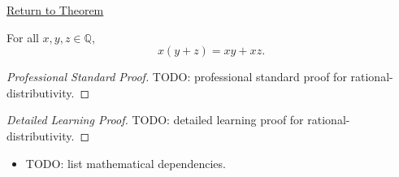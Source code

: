 \newpage
{}
\label{prf:rational-distributivity}

\begin{remark*}[Return]
\hyperref[thm:rational-distributivity]{Return to Theorem}
\end{remark*}

\begin{theorem*}
For all $x,y,z\in\mathbb{Q}$,
\[
x(y+z)=xy+xz.
\]
\end{theorem*}

\begin{proof}[Professional Standard Proof]
\LRAProofBodyStart
TODO: professional standard proof for rational-distributivity.
\end{proof}

\begin{proof}[Detailed Learning Proof]
\LRAProofBodyStart
TODO: detailed learning proof for rational-distributivity.
\end{proof}

\begin{remark*}
\end{remark*}

\begin{dependencies}
\begin{itemize}
  \item TODO: list mathematical dependencies.
\end{itemize}
\end{dependencies}

\clearpage
